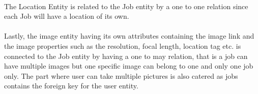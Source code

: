 \\
The Location Entity is related to the Job entity by a one to one relation since each Job will have a location of its own.\\
\\
Lastly, the image entity having its own attributes containing the image link and the image properties such as the resolution, focal length, location tag etc. is connected to the Job entity by having a one to may relation, that is a job can have multiple images but one specific image can belong to one and only one job only. The part where user can take multiple pictures is also catered as jobs contains the foreign key for the user entity.\\





 

